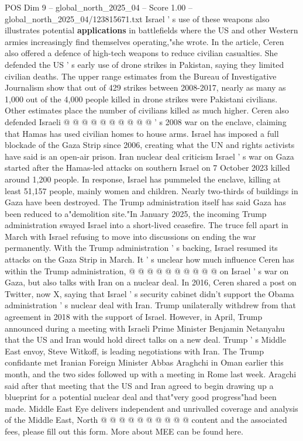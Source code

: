 \begin{textsample}{POS Dim 9 – global\_north\_2025\_04 – Score 1.00 – global\_north\_2025\_04/123815671.txt}
Israel ' s use of these weapons also illustrates potential \textbf{applications} in battlefields where the US and other Western armies increasingly find themselves operating,"she wrote.
In the article, Ceren also offered a defence of high-tech weapons to reduce civilian casualties.
She defended the US ' s early use of drone strikes in Pakistan, saying they limited civilian deaths.
The upper range estimates from the Bureau of Investigative Journalism show that out of 429 strikes between 2008-2017, nearly as many as 1,000 out of the 4,000 people killed in drone strikes were Pakistani civilians.
Other estimates place the number of civilians killed as much higher.
Ceren also defended Israeli @ @ @ @ @ @ @ @ @ @ ' s 2008 war on the enclave, claiming that Hamas has used civilian homes to house arms.
Israel has imposed a full blockade of the Gaza Strip since 2006, creating what the UN and rights activists have said is an open-air prison.
Iran nuclear deal criticism Israel ' s war on Gaza started after the Hamas-led attacks on southern Israel on 7 October 2023 killed around 1,200 people.
In response, Israel has pummeled the enclave, killing at least 51,157 people, mainly women and children.
Nearly two-thirds of buildings in Gaza have been destroyed.
The Trump administration itself has said Gaza has been reduced to a"demolition site."In January 2025, the incoming Trump administration swayed Israel into a short-lived ceasefire.
The truce fell apart in March with Israel refusing to move into discussions on ending the war permanently.
With the Trump administration ' s backing, Israel resumed its attacks on the Gaza Strip in March.
It ' s unclear how much influence Ceren has within the Trump administration, @ @ @ @ @ @ @ @ @ @ on Israel ' s war on Gaza, but also talks with Iran on a nuclear deal.
In 2016, Ceren shared a post on Twitter, now X, saying that Israel ' s security cabinet didn't support the Obama administration ' s nuclear deal with Iran.
Trump unilaterally withdrew from that agreement in 2018 with the support of Israel.
However, in April, Trump announced during a meeting with Israeli Prime Minister Benjamin Netanyahu that the US and Iran would hold direct talks on a new deal.
Trump ' s Middle East envoy, Steve Witkoff, is leading negotiations with Iran.
The Trump confidante met Iranian Foreign Minister Abbas Araghchi in Oman earlier this month, and the two sides followed up with a meeting in Rome last week.
Aragchi said after that meeting that the US and Iran agreed to begin drawing up a blueprint for a potential nuclear deal and that"very good progress"had been made.
Middle East Eye delivers independent and unrivalled coverage and analysis of the Middle East, North @ @ @ @ @ @ @ @ @ @ content and the associated fees, please fill out this form.
More about MEE can be found here.

\end{textsample}
